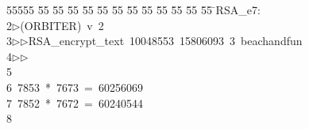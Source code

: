 %
%
\begin{tabbing}
55555 \= 55 \= 55 \= 55 \= 55 \= 55 \= 55 \= 55 \= 55 \= 55 \= 55 \= 55 \= 55 \= \>RSA\_e7:\\[0pt]
2\>$\triangleright$\>(ORBITER)\ v\ 2\ \\[0pt]
3\>$\triangleright$\>$\triangleright$\>RSA\_encrypt\_text\ 10048553\ 15806093\ 3\ beachandfun\\[0pt]
4\>$\triangleright$\>$\triangleright$\>\\[0pt]
5\>\\[0pt]
6\>\ 7853\ *\ 7673\ =\ 60256069\\[0pt]
7\>\ 7852\ *\ 7672\ =\ 60240544\\[0pt]
8\>\end{tabbing}
